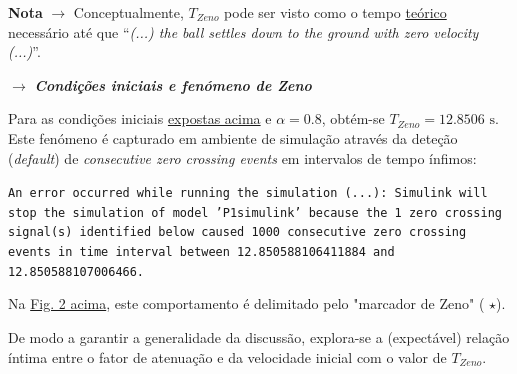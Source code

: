 \vspace{-0.5em}
\noindent \textbf{Nota} $\pmb{\rightarrow}$ Conceptualmente, $T_{Zeno}$ pode ser visto como o tempo \underline{teórico} necessário até que ``\textit{(...) the ball settles down to the ground with zero velocity (...)}''\cite{mathworks-bouncingball}.

\clearpage

\noindent $\pmb{\rightarrow}$ \textbf{\textit{Condições iniciais e fenómeno de Zeno}}

\noindent Para as condições iniciais \hyperref[fig:P1-SistemaCompleto]{expostas acima} e $\alpha = 0.8$, obtém-se $T_{Zeno} = 12.8506\text{ s}$. Este fenómeno é capturado em ambiente de simulação através da deteção (\textit{default}) de \textit{consecutive zero crossing events} em intervalos de tempo ínfimos:

\begin{warning}
    \footnotesize\color{red}\texttt{An error occurred while running the simulation (...): Simulink will stop the simulation of model 'P1simulink' because the 1 zero crossing signal(s) identified below caused 1000 consecutive zero crossing events in time interval between 12.850588106411884 and 12.850588107006466.}
\end{warning}

\vspace{-0.5em}
\noindent Na \hyperref[fig:P1-SistemaCompleto]{Fig. 2 acima}, este comportamento é delimitado pelo "marcador de Zeno" ({\color{red} $\star$}).

De modo a garantir a generalidade da discussão, explora-se a (expectável) relação íntima entre o fator de atenuação e da velocidade inicial com o valor de $T_{Zeno}$. 

